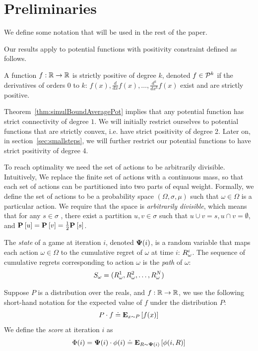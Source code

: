 \documentclass{article}[12pt]
\begin{document}
\section{Preliminaries} \label{sec:preliminaries}

We define some notation that will be used in the rest of the paper.

Our results apply to potential functions with positivity constraint
defined as follows.
\begin{definition}
A function $f:\reals \to \reals$ is strictly positive of degree $k$, 
denoted $f \in \SP{k}$ if the derivatives of orders 0 to $k$:  
$f(x), \frac{d}{dx}f(x), \ldots, \frac{d^k}{dx^k}f(x)$ exist and are strictly positive.
\end{definition}
Theorem~\ref{thm:simulBoundAveragePot} implies that any potential
function has strict connectivity of degree $1$. We will initially restrict
ourselves to potential functions that are strictly convex, i.e. have
strict positivity of degree 2. Later on, in
section~\ref{sec:smallsteps}, we will further restrict our potential
functions to have strict positivity of degree 4.

To reach optimality we need the set of actions to be arbitrarily
divisible. Intuitively, We replace the finite set of actions with a
continuous mass, so that each set of actions can be partitioned into
two parts of equal weight.
Formally, we define the set of actions to be a probability space
$(\Omega,\sigma,\mu)$ such that $\omega \in \Omega$ is a particular
action. We require that the space is {\em arbitrarily divisible},
which means that for any $s \in \sigma$ ,
there exist a partition $u,v \in \sigma$ such that $u \cup v = s, u
\cap v = \emptyset$, and  $\P{}{u}=\P{}{v}=\frac{1}{2} \P{}{s}$.

The {\em state} of a game at iteration $i$, denoted $\state(i)$, is
a random variable that maps each action $\omega \in \Omega$ to the
cumulative regret of $\omega$ at time $i$: $\R_\omega^i$. The sequence
of cumulative regrets corresponding to action $\omega$ is the {\em
  path} of $\omega$:
\begin{equation} \label{eqn:path}
  S_{\omega}=(\R_\omega^1,\R_\omega^2,\ldots,\R_\omega^N)
\end{equation}

Suppose $P$ is a distribution over the reals, and $f:\reals
\to \reals$, we use the following short-hand notation for the expected
value of $f$ under the distribution $P$:
\[ P \cdot f \doteq \E{x \sim P}{f(x)}  \]
We define the {\em score} at iteration $i$ as
\[ \score(i) = \state(i) \cdot \pot(i) \doteq \E{\R \sim \state(i)}{\pot(i,\R)}\]
\end{document}

